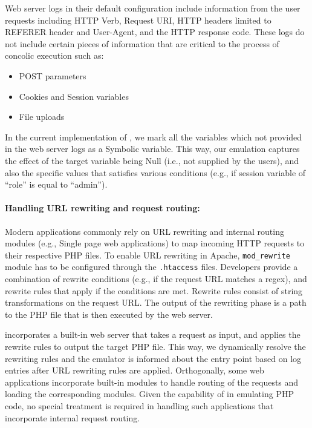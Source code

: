 Web server logs in their default configuration include information from the user requests including HTTP Verb, Request URI, HTTP headers limited to REFERER header and User-Agent, and the HTTP response code. 
These logs do not include certain pieces of information that are critical to the process of concolic execution such as:

\begin{itemize}
    \item POST parameters
    \item Cookies and Session variables
    \item File uploads
\end{itemize}

In the current implementation of \animatedead{}, we mark all the variables which not provided in the web server logs as a Symbolic variable. 
This way, our emulation captures the effect of the target variable being Null (i.e., not supplied by the users), and also the specific values that satisfies various conditions (e.g., if session variable of ``role'' is equal to ``admin''). 

\paragraph{Handling URL rewriting and request routing:} 

Modern applications commonly rely on URL rewriting and internal routing modules (e.g., Single page web applications) to map incoming HTTP requests to their respective PHP files. 
To enable URL rewriting in Apache, \texttt{mod\_rewrite} module has to be configured through the \texttt{.htaccess} files. 
Developers provide a combination of rewrite conditions (e.g., if the request URL matches a regex), and rewrite rules that apply if the conditions are met. 
Rewrite rules consist of string transformations on the request URL. 
The output of the rewriting phase is a path to the PHP file that is then executed by the web server. 

\animatedead{} incorporates a built-in web server that takes a request as input, and applies the rewrite rules to output the target PHP file. 
This way, we dynamically resolve the rewriting rules and the emulator is informed about the entry point based on log entries after URL rewriting rules are applied. 
Orthogonally, some web applications incorporate built-in modules to handle routing of the requests and loading the corresponding modules. 
Given the capability of \animatedead{} in emulating PHP code, no special treatment is required in handling such applications that incorporate internal request routing. 

